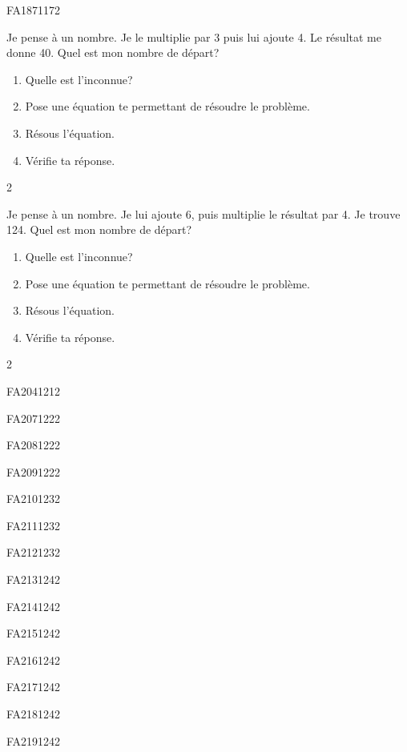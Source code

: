 \documentclass[a4paper,11pt]{report}
\begin{document}
\begin{exol}{FA187}{117}{2}
\end{exol}

\begin{exo}
  {Je pense à un nombre. Je le multiplie par 3 puis lui ajoute 4. Le résultat me donne 40. Quel est mon nombre de départ?
\begin{enumerate}
    \item Quelle est l'inconnue?
    \item Pose une équation te permettant de résoudre le problème.
    \item Résous l'équation.
    \item Vérifie ta réponse.
\end{enumerate}
}
 {2} 
\end{exo}

\begin{exo}
  {Je pense à un nombre. Je lui ajoute 6, puis multiplie le résultat par 4. Je trouve 124. Quel est mon nombre de départ?
\begin{enumerate}
    \item Quelle est l'inconnue?
    \item Pose une équation te permettant de résoudre le problème.
    \item Résous l'équation.
    \item Vérifie ta réponse.
\end{enumerate}
}
 {2} 
\end{exo}

\begin{exol}{FA204}{121}{2}
\end{exol}
\begin{exol}{FA207}{122}{2}
\end{exol}
\begin{exol}{FA208}{122}{2}
\end{exol}
\begin{exol}{FA209}{122}{2}
\end{exol}
\begin{exol}{FA210}{123}{2}
\end{exol}
\begin{exol}{FA211}{123}{2}
\end{exol}
\begin{exol}{FA212}{123}{2}
\end{exol}
\begin{exol}{FA213}{124}{2}
\end{exol}
\begin{exol}{FA214}{124}{2}
\end{exol}
\begin{exol}{FA215}{124}{2}
\end{exol}
\begin{exol}{FA216}{124}{2}
\end{exol}
\begin{exol}{FA217}{124}{2}
\end{exol}
\begin{exol}{FA218}{124}{2}
\end{exol}
\begin{exol}{FA219}{124}{2}
\end{exol}
\end{document}
